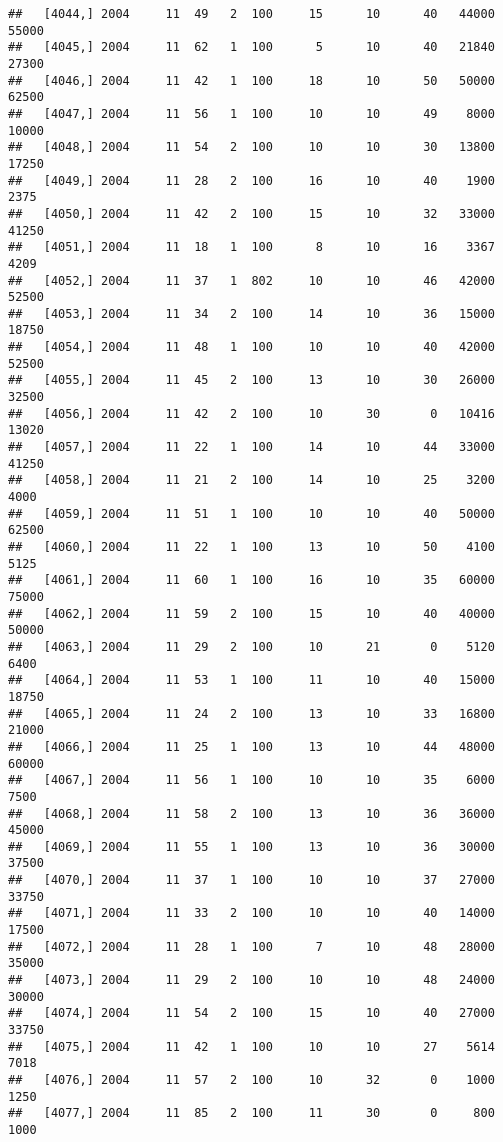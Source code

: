 \documentclass{article}\usepackage[]{graphicx}\usepackage[]{color}
\makeatletter
\newenvironment{kframe}{%
 \def\at@end@of@kframe{}%
 \ifinner\ifhmode%
  \def\at@end@of@kframe{\end{minipage}}%
  \begin{minipage}{\columnwidth}%
 \fi\fi%
 \def\FrameCommand##1{\hskip\@totalleftmargin \hskip-\fboxsep
 \colorbox{shadecolor}{##1}\hskip-\fboxsep
     \hskip-\linewidth \hskip-\@totalleftmargin \hskip\columnwidth}%
 \MakeFramed {\advance\hsize-\width
   \@totalleftmargin\z@ \linewidth\hsize
   \@setminipage}}%
 {\par\unskip\endMakeFramed%
 \at@end@of@kframe}
\newenvironment{knitrout}{}{} %
\makeatother
\begin{document}
\begin{knitrout}
\begin{kframe}
\begin{verbatim}
##   [4044,] 2004     11  49   2  100     15      10      40   44000   55000
##   [4045,] 2004     11  62   1  100      5      10      40   21840   27300
##   [4046,] 2004     11  42   1  100     18      10      50   50000   62500
##   [4047,] 2004     11  56   1  100     10      10      49    8000   10000
##   [4048,] 2004     11  54   2  100     10      10      30   13800   17250
##   [4049,] 2004     11  28   2  100     16      10      40    1900    2375
##   [4050,] 2004     11  42   2  100     15      10      32   33000   41250
##   [4051,] 2004     11  18   1  100      8      10      16    3367    4209
##   [4052,] 2004     11  37   1  802     10      10      46   42000   52500
##   [4053,] 2004     11  34   2  100     14      10      36   15000   18750
##   [4054,] 2004     11  48   1  100     10      10      40   42000   52500
##   [4055,] 2004     11  45   2  100     13      10      30   26000   32500
##   [4056,] 2004     11  42   2  100     10      30       0   10416   13020
##   [4057,] 2004     11  22   1  100     14      10      44   33000   41250
##   [4058,] 2004     11  21   2  100     14      10      25    3200    4000
##   [4059,] 2004     11  51   1  100     10      10      40   50000   62500
##   [4060,] 2004     11  22   1  100     13      10      50    4100    5125
##   [4061,] 2004     11  60   1  100     16      10      35   60000   75000
##   [4062,] 2004     11  59   2  100     15      10      40   40000   50000
##   [4063,] 2004     11  29   2  100     10      21       0    5120    6400
##   [4064,] 2004     11  53   1  100     11      10      40   15000   18750
##   [4065,] 2004     11  24   2  100     13      10      33   16800   21000
##   [4066,] 2004     11  25   1  100     13      10      44   48000   60000
##   [4067,] 2004     11  56   1  100     10      10      35    6000    7500
##   [4068,] 2004     11  58   2  100     13      10      36   36000   45000
##   [4069,] 2004     11  55   1  100     13      10      36   30000   37500
##   [4070,] 2004     11  37   1  100     10      10      37   27000   33750
##   [4071,] 2004     11  33   2  100     10      10      40   14000   17500
##   [4072,] 2004     11  28   1  100      7      10      48   28000   35000
##   [4073,] 2004     11  29   2  100     10      10      48   24000   30000
##   [4074,] 2004     11  54   2  100     15      10      40   27000   33750
##   [4075,] 2004     11  42   1  100     10      10      27    5614    7018
##   [4076,] 2004     11  57   2  100     10      32       0    1000    1250
##   [4077,] 2004     11  85   2  100     11      30       0     800    1000

\end{verbatim}
\end{kframe}
\end{knitrout}
\end{document}
